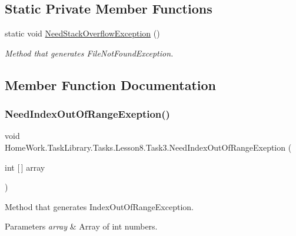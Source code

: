 \subsection*{Static Private Member Functions}
\begin{DoxyCompactItemize}
\item 
static void \mbox{\hyperlink{class_home_work_1_1_task_library_1_1_tasks_1_1_lesson8_1_1_task3_aa89258a602d616e1ff80b47b052462c6}{Need\+Stack\+Overflow\+Exception}} ()
\begin{DoxyCompactList}\small\item\em Method that generates File\+Not\+Found\+Exception. \end{DoxyCompactList}\end{DoxyCompactItemize}


\subsection{Member Function Documentation}
\mbox{\label{class_home_work_1_1_task_library_1_1_tasks_1_1_lesson8_1_1_task3_ad9ddfa1443dc7cb6ce0e8da79409e46b}} 
\subsubsection{\texorpdfstring{NeedIndexOutOfRangeExeption()}{NeedIndexOutOfRangeExeption()}}
{\footnotesize\ttfamily void Home\+Work.\+Task\+Library.\+Tasks.\+Lesson8.\+Task3.\+Need\+Index\+Out\+Of\+Range\+Exeption (\begin{DoxyParamCaption}\item[{int \mbox{[}$\,$\mbox{]}}]{array }\end{DoxyParamCaption})\hspace{0.3cm}{\ttfamily [private]}}



Method that generates Index\+Out\+Of\+Range\+Exception. 


\begin{DoxyParams}{Parameters}
{\em array} & Array of int numbers.\\
\hline
\end{DoxyParams}
\mbox{\label{class_home_work_1_1_task_library_1_1_tasks_1_1_lesson8_1_1_task3_aa89258a602d616e1ff80b47b052462c6}} 
